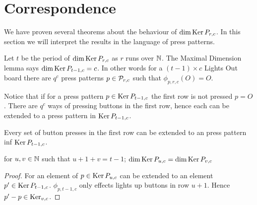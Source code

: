 \section{Correspondence}

We have proven several theorems about the behaviour of $\dim\operatorname{Ker}
P_{r,c}$. In this section we will interpret the results in the
language of press patterns.

Let $t$ be the period of $\dim\operatorname{Ker} P_{r,c}$ as $r$ runs over $\mathbb{N}$. The
Maximal Dimension lemma says $\dim\operatorname{Ker} P_{t-1,c} = c$. In other words
for a $(t-1)\times c$ Lights Out board there are $q^{c}$ press
patterns $p\in\mathcal{P}_{r,c}$ such that $\phi_{p,r,c}(O) = O$.

Notice that if for a press pattern $p\in\operatorname{Ker} P_{t-1,c}$ the first row
is not pressed $p = O$. There are $q^{c}$ ways of pressing buttons in
the first row, hence each can be extended to a press pattern in $\operatorname{Ker}
P_{t-1,c}$.

\begin{lemma}
    Every set of button presses in the first row can be extended to an
    press pattern inf $\operatorname{Ker} P_{t-1,c}$.
\end{lemma}

\begin{lemma}
    for $u,v \in \mathbb{N}$ such that $u + 1 + v = t-1$; $\dim\operatorname{Ker} P_{u,c} =
    \dim\operatorname{Ker} P_{v,c}$
\end{lemma}

\begin{proof}
    For an element of $p \in \operatorname{Ker} P_{u,c}$ can be extended to an
    element $p' \in \operatorname{Ker} P_{t-1, c}$. $\phi_{p,t-1,c}$ only effects
    lights up buttons in row $u+1$. Hence $p'-p \in \operatorname{Ker}_{v,c}$.
\end{proof}
